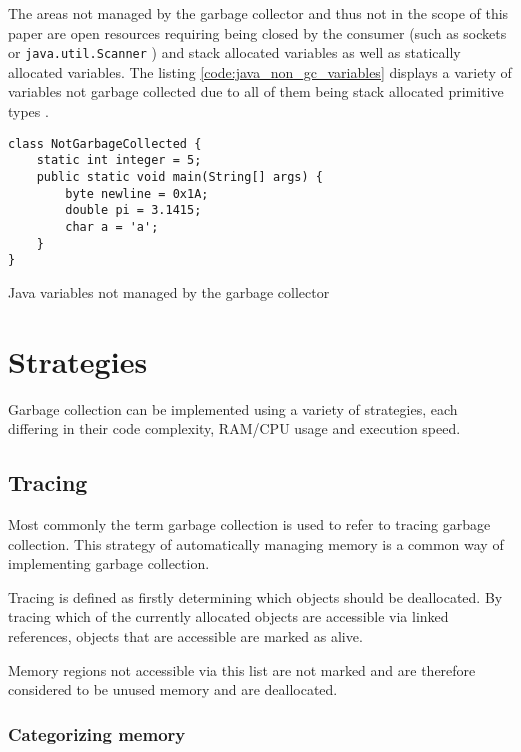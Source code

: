 The areas not managed by the garbage collector and thus not in the scope of
this paper are open resources requiring being closed by the consumer (such as
sockets or \texttt{java.util.Scanner} \cite[close]{java-util-scanner}) and
stack allocated variables as well as statically allocated variables. The
listing \autoref{code:java_non_gc_variables} displays a variety of variables
not garbage collected due to all of them being stack allocated primitive types
\cite[4.2. Primitive Types and Values]{java_language_spec_2023}.

\begin{listing}[H] 
    \begin{verbatim} 
class NotGarbageCollected {
    static int integer = 5;
    public static void main(String[] args) {
        byte newline = 0x1A;
        double pi = 3.1415;
        char a = 'a';
    }
}
    \end{verbatim}
    \caption{Java variables not managed by the garbage collector}
    \label{code:java_non_gc_variables}
\end{listing}

\section{Strategies}

Garbage collection can be implemented using a variety of strategies, each
differing in their code complexity, RAM/CPU usage and execution speed.

\subsection{Tracing}

Most commonly the term garbage collection is used to refer to tracing garbage
collection. This strategy of automatically managing memory is a common way of
implementing garbage collection.

Tracing is defined as firstly determining which objects should be deallocated.
By tracing which of the currently allocated objects are accessible via linked
references, objects that are accessible are marked as alive.

Memory regions not accessible via this list are not marked and are therefore
considered to be unused memory and are deallocated.

\subsubsection{Categorizing memory}

